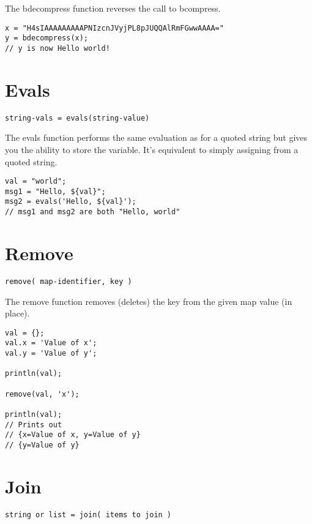 The bdecompress function reverses the call to bcompress.

\begin{lstlisting}[caption={bdecompress example}]
x = "H4sIAAAAAAAAAPNIzcnJVyjPL8pJUQQAlRmFGwwAAAA="
y = bdecompress(x);
// y is now Hello world!

\end{lstlisting}

\section{Evals}
\begin{Verbatim}
string-vals = evals(string-value)
\end{Verbatim}

The evals function performs the same evaluation as for a quoted string but gives you
the ability to store the variable. It's equivalent to simply assigning from a quoted string.

\begin{lstlisting}[caption={evals example}]
val = "world";
msg1 = "Hello, ${val}";
msg2 = evals('Hello, ${val}');
// msg1 and msg2 are both "Hello, world"
\end{lstlisting}

\section{Remove}
\begin{Verbatim}
remove( map-identifier, key )
\end{Verbatim}

The remove function removes (deletes) the key from the given map value (in place).

\begin{lstlisting}[caption={remove example}]
val = {};
val.x = 'Value of x';
val.y = 'Value of y';

println(val);

remove(val, 'x');

println(val);
// Prints out
// {x=Value of x, y=Value of y}
// {y=Value of y}
\end{lstlisting}

\section{Join}
\begin{Verbatim}
string or list = join( items to join )
\end{Verbatim}

